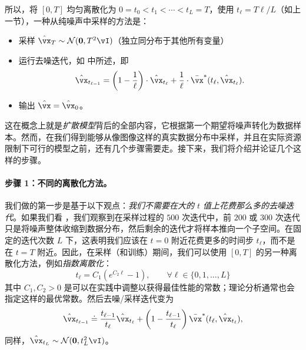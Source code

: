 \documentclass[../../book-main_zh.tex]{subfiles}
\begin{document}
所以，将 \([0, T]\) 均匀离散化为 \(0 = t_{0} < t_{1} < \cdots < t_{L} = T\)，使用 \(t_{\ell} = T\ell / L\)（如上一节），一种从纯噪声中采样的方法是：
\begin{itemize}
	\item 采样 \(\hat{\vx}_{T} \sim \dNorm(\vzero, T^{2}\vI)\)（独立同分布于其他所有变量）
	\item 运行去噪迭代，如  中所述，即
		\begin{equation}\label{eq:denoising-iteration-basic}
		\hat{\vx}_{t_{\ell - 1}} = \bp{1 - \frac{1}{\ell}}\cdot\hat{\vx}_{t_{\ell}} + \frac{1}{\ell}\cdot\bar{\vx}^{\ast}(t_{\ell}, \hat{\vx}_{t_{\ell}}).
	\end{equation}
	\item 输出 \(\hat{\vx} = \hat{\vx}_{0}\)。
\end{itemize}
这在概念上就是\textit{扩散模型}背后的全部内容，它根据第一个期望将噪声转化为数据样本。然而，在我们得到能够从像图像这样的真实数据分布中采样，并且在实际资源限制下可行的模型之前，还有几个步骤需要走。接下来，我们将介绍并论证几个这样的步骤。

\paragraph{步骤 1：不同的离散化方法。} 我们做的第一步是基于以下观点：\textit{我们不需要在大的 \(t\) 值上花费那么多的去噪迭代}。如果我们看 ，我们观察到在采样过程的 \(500\) 次迭代中，前 \(200\) 或 \(300\) 次迭代只是将噪声整体收缩到数据分布，然后剩余的迭代才将样本推向一个子空间。在固定的迭代次数 \(L\) 下，这表明我们应该在 \(t = 0\) 附近花费更多的时间步 \(t_{\ell}\)，而不是在 \(t = T\) 附近。因此，在采样（和训练）期间，我们可以使用 \([0, T]\) 的另一种离散化方法，例如\textit{指数离散化}：
\begin{equation}\label{eq:denoising_exponential_discretization}
	t_{\ell} = C_{1}(e^{C_{2}\ell} - 1), \qquad \forall \ell \in \{0, 1, \dots, L\}
\end{equation}
其中 \(C_{1}, C_{2} > 0\) 是可以在实践中调整以获得最佳性能的常数；理论分析通常也会指定这样的最优常数。然后去噪/采样迭代变为
\begin{equation}\label{eq:denoising_iteration}
	\hat{\vx}_{t_{\ell - 1}} \doteq \frac{t_{\ell - 1}}{t_{\ell}}\hat{\vx}_{t_{\ell}} + \bp{1 - \frac{t_{\ell - 1}}{t_{\ell}}}\bar{\vx}^{\ast}(t_{\ell}, \hat{\vx}_{t_{\ell}}),
\end{equation}
同样，\(\hat{\vx}_{t_{L}} \sim \dNorm(\vzero, t_{L}^{2}\vI)\)。
\end{document}
